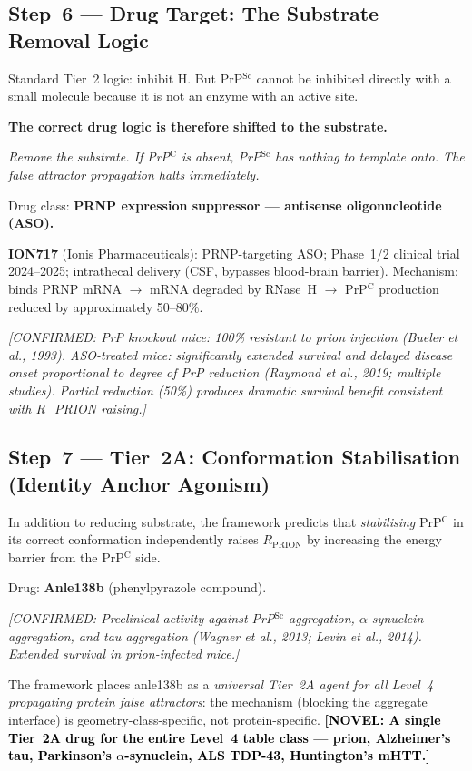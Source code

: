 \documentclass[12pt,a4paper]{article}
\newcommand{\rprion}{$R_{\mathrm{PRION}}$}
\newcommand{\prpc}{PrP$^{\mathrm{C}}$}
\newcommand{\prpsc}{PrP$^{\mathrm{Sc}}$}
\newcommand{\novel}[1]{\textbf{\textcolor{black}{[NOVEL: #1]}}}
\newcommand{\confirmed}[1]{\textit{[CONFIRMED: #1]}}
\begin{document}
\subsection{Step~6 --- Drug Target: The Substrate Removal Logic}

Standard Tier~2 logic: inhibit H. But \prpsc{} cannot be inhibited
directly with a small molecule because it is not an enzyme with an
active site.

\textbf{The correct drug logic is therefore shifted to the substrate.}

\begin{center}
  \textit{Remove the substrate. If \prpc{} is absent, \prpsc{} has nothing
  to template onto. The false attractor propagation halts immediately.}
\end{center}

Drug class: \textbf{PRNP expression suppressor --- antisense oligonucleotide
(ASO).}

\textbf{ION717} (Ionis Pharmaceuticals): PRNP-targeting ASO; Phase~1/2
clinical trial 2024--2025; intrathecal delivery (CSF, bypasses blood-brain
barrier). Mechanism: binds PRNP mRNA $\to$ mRNA degraded by RNase~H $\to$
\prpc{} production reduced by approximately 50--80\%.

\confirmed{PrP knockout mice: 100\% resistant to prion injection (Bueler et
al., 1993). ASO-treated mice: significantly extended survival and delayed
disease onset proportional to degree of PrP reduction (Raymond et al., 2019;
multiple studies). Partial reduction (50\%) produces dramatic survival benefit
consistent with R\_PRION raising.}

\subsection{Step~7 --- Tier~2A: Conformation Stabilisation (Identity Anchor
Agonism)}

In addition to reducing substrate, the framework predicts that
\textit{stabilising} \prpc{} in its correct conformation independently
raises \rprion{} by increasing the energy barrier from the \prpc{} side.

Drug: \textbf{Anle138b} (phenylpyrazole compound).

\confirmed{Preclinical activity against \prpsc{} aggregation, $\alpha$-synuclein
aggregation, and tau aggregation (Wagner et al., 2013; Levin et al., 2014).
Extended survival in prion-infected mice.}

The framework places anle138b as a \textit{universal Tier~2A agent for all
Level~4 propagating protein false attractors}: the mechanism (blocking the
aggregate interface) is geometry-class-specific, not protein-specific.
\novel{A single Tier~2A drug for the entire Level~4 table class --- prion,
Alzheimer's tau, Parkinson's $\alpha$-synuclein, ALS TDP-43, Huntington's
mHTT.}
\end{document}

